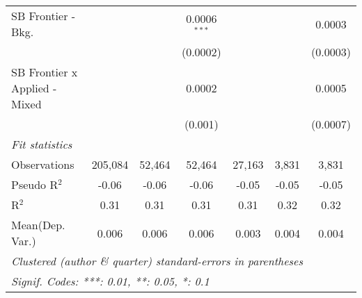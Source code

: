 \begin{tabular}{lcccccc}
   SB Frontier - Bkg.            &               &          & 0.0006$^{***}$ &          &              & 0.0003\\   
                                 &               &          & (0.0002)       &          &              & (0.0003)\\   
   SB Frontier x Applied - Mixed &               &          & 0.0002         &          &              & 0.0005\\   
                                 &               &          & (0.001)        &          &              & (0.0007)\\   
   \midrule
   \emph{Fit statistics}\\
   Observations                  & 205,084       & 52,464   & 52,464         & 27,163   & 3,831        & 3,831\\  
   Pseudo R$^2$                  & -0.06         & -0.06    & -0.06          & -0.05    & -0.05        & -0.05\\  
   R$^2$                         & 0.31          & 0.31     & 0.31           & 0.31     & 0.32         & 0.32\\  
Mean(Dep. Var.) & 0.006 & 0.006 & 0.006 & 0.003 & 0.004 & 0.004 \\
   \midrule \midrule
   \multicolumn{7}{l}{\emph{Clustered (author \& quarter) standard-errors in parentheses}}\\
   \multicolumn{7}{l}{\emph{Signif. Codes: ***: 0.01, **: 0.05, *: 0.1}}\\
\end{tabular}
\par\endgroup
